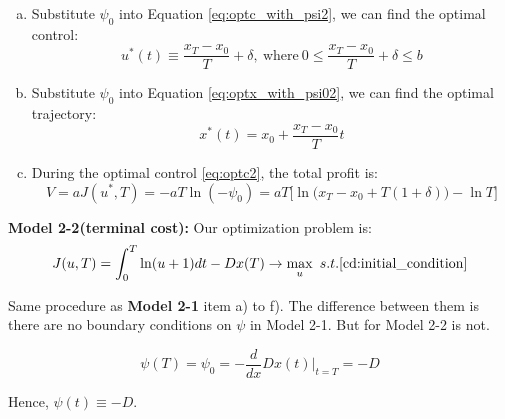 \begin{enumerate}[a)]
    \item    Substitute $\psi_0$ into Equation \eqref{eq:optc_with_psi2}, we can find the optimal control:
        \begin{equation}\label{eq:optc2}
            u^*(t)\equiv\frac{x_T-x_0}{T}+\delta,\ \text{where}\ 0\leq\frac{x_T-x_0}{T}+\delta\leq b
        \end{equation}
    \item Substitute $\psi_0$ into Equation \eqref{eq:optx_with_psi02}, we can find the optimal trajectory:
        \begin{equation}\label{eq:optx2}
            x^*(t)=x_0+\frac{x_T-x_0}{T}t
        \end{equation}
    \item During the optimal control \eqref{eq:optc2}, the total profit is:
        \begin{equation}
            V=aJ(u^*,T)=-aT\ln(-\psi_0)=aT\biggl[\ln\big(x_T-x_0+T(1+\delta)\big)-\ln T\biggr]
        \end{equation}
\end{enumerate}

{\bf Model 2-2(terminal cost):} Our optimization problem is:
\begin{equation}
    J(u,T)=\int_{0}^{T}\ln(u+1)dt-Dx(T)\rightarrow \max_{u}\ s.t. \eqref{cd:initial_condition}
\end{equation}

Same procedure as \textbf{Model 2-1} item a) to f). The difference between them is there are no boundary conditions on $\psi$ in Model 2-1. But for Model 2-2 is not.

\begin{equation}
    \psi(T)=\psi_0=-\frac{d}{dx}Dx(t)\bigg|_{t=T}=-D
\end{equation}

Hence, $\psi(t)\equiv-D$.

